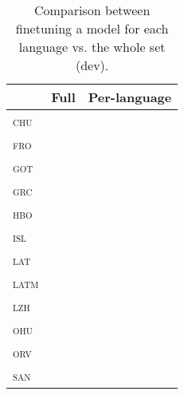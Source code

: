 \documentclass{../acl_latex.tex}
\begin{document}
\begin{table}[t]
\centering
\begin{tabular}{lll}
\toprule
                 & Full     & Per-language \\ \midrule
\textsc{chu}     &          &              \\ 
\textsc{fro}     &          &              \\
\textsc{got}     &          &              \\
\textsc{grc}     &          &              \\
\textsc{hbo}     &          &              \\
\textsc{isl}     &          &              \\
\textsc{lat}     &          &              \\
\textsc{latm}    &          &              \\
\textsc{lzh}     &          &              \\
\textsc{ohu}     &          &              \\
\textsc{orv}     &          &              \\
\textsc{san}     &          &              \\ \bottomrule 
\end{tabular}
\caption{
    Comparison between finetuning a model for each language vs. the whole set (dev).
}
\end{table}
\end{document}
